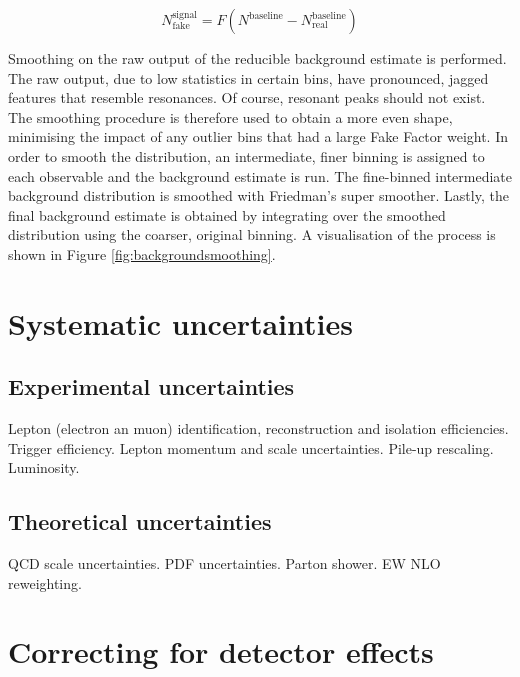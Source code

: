 $$N_{\text{fake}}^{\text{signal}} = F(N^{\text{baseline}}-N^{\text{baseline}}_{\text{real}})$$


Smoothing on the raw output of the reducible background estimate is performed. The raw output, due to low statistics in certain bins, have pronounced, jagged features that resemble resonances. Of course, resonant peaks should not exist. The smoothing procedure is therefore used to obtain a more even shape, minimising the impact of any outlier bins that had a large Fake Factor weight. In order to smooth the distribution, an intermediate, finer binning is assigned to each observable and the background estimate is run. The fine-binned intermediate background distribution is smoothed with Friedman's super smoother. Lastly, the final background estimate is obtained by integrating over the smoothed distribution using the coarser, original binning. A visualisation of the process is shown in Figure \ref{fig:backgroundsmoothing}.


\section{Systematic uncertainties}
\label{sec:sysuncert}

\subsection{Experimental uncertainties}

Lepton (electron an muon) identification, reconstruction and isolation efficiencies.
Trigger efficiency.
Lepton momentum and scale uncertainties.
Pile-up rescaling.
Luminosity.

\subsection{Theoretical uncertainties}
QCD scale uncertainties.
PDF uncertainties.
Parton shower.
EW NLO reweighting.

\section{Correcting for detector effects}
\label{sec:unfolding}


